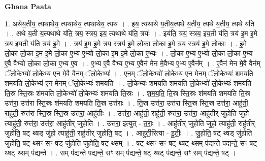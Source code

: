 \documentclass[17pt]{extarticle}
\begin{document}
\textbf{Ghana Paata } \newline

1. अथेय॒तीय॒ त्यथाथेय॒ त्यथाथेय॒ त्यथाथेय॒ त्यथ॑ । . इय॒ त्यथाथे य॒तीय॒त्यथे य॒तीय॒ त्यथे य॒तीय॒ त्यथे य॑ति । . अथे य॒ती य॒त्यथाथे य॑ति॒ त्रय॒ स्त्रय॒ इय॒ त्यथाथे य॑ति॒ त्रयः॑ । . इय॑ति॒ त्रय॒ स्त्रय॒ इय॒ती य॑ति॒ त्रय॑ इ॒म इ॒मे त्रय॒ इय॒ती य॑ति॒ त्रय॑ इ॒मे । . त्रय॑ इ॒म इ॒मे त्रय॒ स्त्रय॑ इ॒मे लो॒का लो॒का इ॒मे त्रय॒ स्त्रय॑ इ॒मे लो॒काः । . इ॒मे लो॒का लो॒का इ॒म इ॒मे लो॒का ए॒भ्य ए॒भ्यो लो॒का इ॒म इ॒मे लो॒का ए॒भ्यः । . लो॒का ए॒भ्य ए॒भ्यो लो॒का लो॒का ए॒भ्य ए॒वै वैभ्यो लो॒का लो॒का ए॒भ्य ए॒व । . ए॒भ्य ए॒वै वैभ्य ए॒भ्य ए॒वैन॑ मेन मे॒वैभ्य ए॒भ्य ए॒वैन᳚म् । . ए॒वैन॑ मेन मे॒वै वैन॑म् ॅलो॒केभ्यो॑ लो॒केभ्य॑ एन मे॒वै वैन॑म् ॅलो॒केभ्यः॑ । . ए॒न॒म् ॅलो॒केभ्यो॑ लो॒केभ्य॑ एन मेनम् ॅलो॒केभ्यः॑ शमयति शमयति लो॒केभ्य॑ एन मेनम् ॅलो॒केभ्यः॑ शमयति । . लो॒केभ्यः॑ शमयति शमयति लो॒केभ्यो॑ लो॒केभ्यः॑ शमयति ति॒स्र स्ति॒स्रः श॑मयति लो॒केभ्यो॑ लो॒केभ्यः॑ शमयति ति॒स्रः । . श॒म॒य॒ति॒ ति॒स्र स्ति॒स्रः श॑मयति शमयति ति॒स्र उत्त॑रा॒ उत्त॑रा स्ति॒स्रः श॑मयति शमयति ति॒स्र उत्त॑राः । . ति॒स्र उत्त॑रा॒ उत्त॑रा स्ति॒स्र स्ति॒स्र उत्त॑रा॒ आहु॑ती॒ राहु॑ती॒ रुत्त॑रा स्ति॒स्र स्ति॒स्र उत्त॑रा॒ आहु॑तीः । . उत्त॑रा॒ आहु॑ती॒ राहु॑ती॒ रुत्त॑रा॒ उत्त॑रा॒ आहु॑तीर् जुहोति जुहो॒ त्याहु॑ती॒ रुत्त॑रा॒ उत्त॑रा॒ आहु॑तीर् जुहोति । . उत्त॑रा॒ इत्युत् - त॒राः॒ । . आहु॑तीर् जुहोति जुहो॒ त्याहु॑ती॒ राहु॑तीर् जुहोति॒ षट् थ्षड् जु॑हो॒ त्याहु॑ती॒ राहु॑तीर् जुहोति॒ षट् । . आहु॑ती॒रित्या - हु॒तीः॒ । . जु॒हो॒ति॒ षट् थ्षड् जु॑होति जुहोति॒ षट् थ्सꣳ सꣳ षड् जु॑होति जुहोति॒ षट् थ्सम् । . षट् थ्सꣳ सꣳ षट् थ्षट् थ्सम् प॑द्यन्ते पद्यन्ते॒ सꣳ षट् थ्षट् थ्सम् प॑द्यन्ते । . सम् प॑द्यन्ते पद्यन्ते॒ सꣳ सम् प॑द्यन्ते॒ षट् थ्षट् प॑द्यन्ते॒ सꣳ सम् प॑द्यन्ते॒ षट् । \newline
\end{document}
